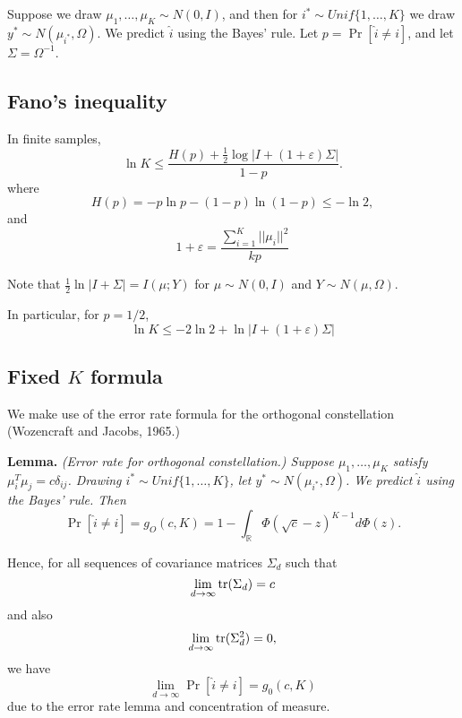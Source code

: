 \documentclass[12pt]{article}
\begin{document}
Suppose we draw $\mu_1,\hdots,\mu_K \sim N(0, I)$, and then
for $i^* \sim Unif\{1,\hdots, K\}$ we draw $y^* \sim N(\mu_{i^*}, \Omega)$.
We predict $\hat{i}$ using the Bayes' rule.  Let $p = \Pr[\hat{i} \neq i]$,
and let $\Sigma = \Omega^{-1}$.

\subsection{Fano's inequality}
In finite samples,
\[
\ln K \leq \frac{H(p) + \frac{1}{2}\log |I + (1+\varepsilon)\Sigma|}{1-p}.
\]
where
\[
H(p) = -p\ln p - (1-p) \ln (1-p) \leq - \ln 2,
\]
and
\[
1 + \varepsilon = \frac{\sum_{i=1}^K ||\mu_i||^2}{kp}
\]

Note that $\frac{1}{2}\ln|I + \Sigma| = I(\mu; Y)$ for $\mu \sim N(0, I)$ and $Y \sim N(\mu, \Omega)$.

In particular, for $p=1/2$,
\[
\ln K \leq -2\ln 2 + \ln |I + (1+\varepsilon)\Sigma|
\]

\subsection{Fixed $K$ formula}

We make use of the error rate formula for the orthogonal constellation (Wozencraft and Jacobs, 1965.)

\noindent\textbf{Lemma.} \emph{
(Error rate for orthogonal constellation.)
Suppose $\mu_1, \hdots, \mu_K$ satisfy $\mu_i^T\mu_j = c\delta_{ij}$.
Drawing $i^* \sim Unif\{1,\hdots, K\}$, let $y^* \sim N(\mu_{i^*}, \Omega)$.
We predict $\hat{i}$ using the Bayes' rule.  Then 
\[
\Pr[\hat{i} \neq i] = g_O(c, K) = 1 - \int_{\mathbb{R}} \Phi(\sqrt{c} - z)^{K-1} d\Phi(z).
\]
}

Hence, for all sequences of covariance matrices $\Sigma_d$ such that 
$$\lim_{d \to \infty} \text{tr}( \Sigma_d )= c$$
and also 
$$\lim_{d \to \infty} \text{tr}( \Sigma_d^2 )= 0,$$
we have
\[
\lim_{d \to \infty} \Pr[\hat{i} \neq i] = g_0(c, K)
\]
due to the error rate lemma and concentration of measure.
\end{document}
